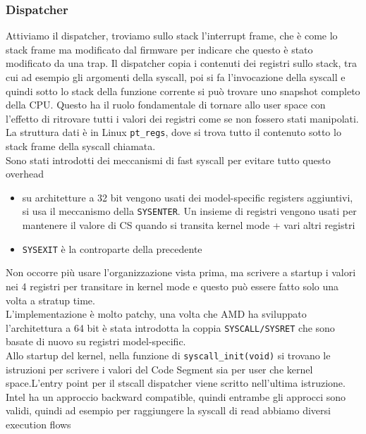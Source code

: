 \documentclass[12pt, oneside]{extbook} %
\begin{document}
\subsubsection{Dispatcher}
Attiviamo il dispatcher, troviamo sullo stack l'interrupt frame, che è come lo stack frame ma modificato dal firmware per indicare che questo è stato modificato da una trap. Il dispatcher copia i contenuti dei registri sullo stack, tra cui ad esempio gli argomenti della syscall, poi si fa l'invocazione della syscall e quindi sotto lo stack della funzione corrente si può trovare uno snapshot completo della CPU. Questo ha il ruolo fondamentale di tornare allo user space con l'effetto di ritrovare tutti i valori dei registri come se non fossero stati manipolati.\\La struttura dati è in Linux \texttt{pt\_regs}, dove si trova tutto il contenuto sotto lo stack frame della syscall chiamata.\\Sono stati introdotti dei meccanismi di fast syscall per evitare tutto questo overhead
\begin{itemize}
\item su architetture a 32 bit vengono usati dei model-specific registers aggiuntivi, si usa il meccanismo della \texttt{SYSENTER}. Un insieme di 
registri vengono usati per mantenere il valore di CS quando si transita kernel mode + vari altri registri
\item \texttt{SYSEXIT} è la controparte della precedente
\end{itemize}
Non occorre più usare l'organizzazione vista prima, ma scrivere a startup i valori nei 4 registri per transitare in kernel mode e questo può essere fatto solo una volta a stratup time.\\L'implementazione è molto patchy, una volta che AMD ha sviluppato l'architettura a 64 bit è stata introdotta la coppia \texttt{SYSCALL/SYSRET} che sono basate di nuovo su registri model-specific.\\Allo startup del kernel, nella funzione di \texttt{syscall\_init(void)} si trovano le istruzioni per scrivere i valori del Code Segment sia per user che kernel space.L'entry point per il stscall dispatcher viene scritto nell'ultima istruzione.\\Intel ha un approccio backward compatible, quindi entrambe gli approcci sono validi, quindi ad esempio per raggiungere la syscall di read abbiamo diversi execution flows\\
\end{document}
